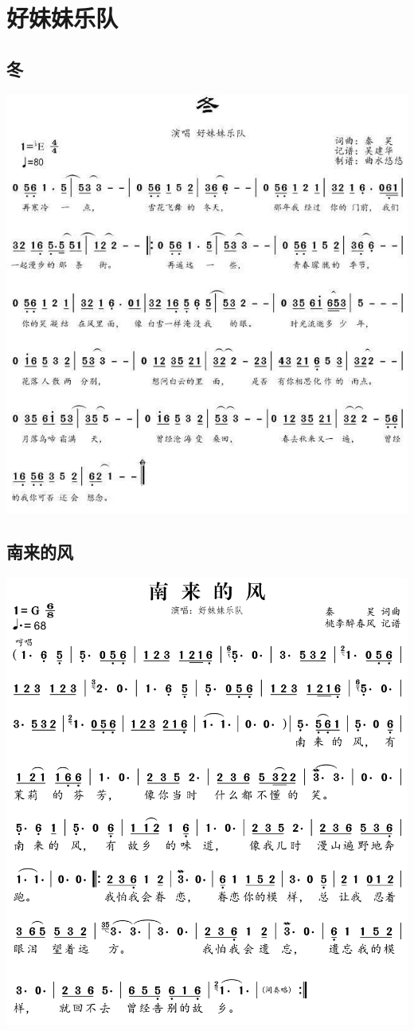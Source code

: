 \documentclass[cn,pad,chinesefont=nofont]{elegantbook}
\begin{document}
\chapter{好妹妹乐队}
\section{冬}
    \includegraphics[width=\textwidth]{dongxiao/20200516-好妹妹-冬.jpg} 
\section{南来的风}
    \includegraphics[width=\textwidth]{dongxiao/20200516-好妹妹-南来的风.jpg} 
\end{document}
